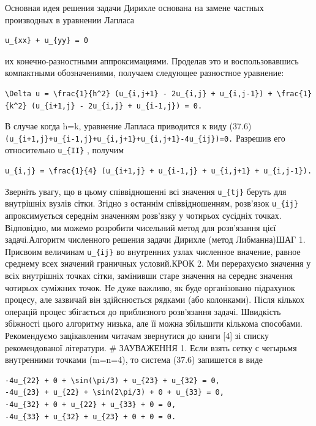 \documentclass[
  ukrainian,
]{article}
\begin{document}
Основная идея решения задачи Дирихле основана на замене частных
производных в уравнении Лапласа

\begin{verbatim}
u_{xx} + u_{yy} = 0
\end{verbatim}

их конечно-разностными аппроксимациями. Проделав это и воспользовавшись
компактными обозначениями, получаем следующее разностное уравнение:

\begin{verbatim}
\Delta u = \frac{1}{h^2} (u_{i,j+1} - 2u_{i,j} + u_{i,j-1}) + \frac{1}{k^2} (u_{i+1,j} - 2u_{i,j} + u_{i-1,j}) = 0.
\end{verbatim}

В случае когда h=k, уравнение Лапласа приводится к виду (37.6)
\texttt{(u\_\{i+1,j\}+u\_\{i-1,j\}+u\_\{i,j+1\}+u\_\{i,j+1\}-4u\_\{ij\})=0.}
Разрешив его относительно \texttt{u\_\{II\}} , получим

\begin{verbatim}
u_{i,j} = \frac{1}{4} (u_{i+1,j} + u_{i-1,j} + u_{i,j+1} + u_{i,j-1}).
\end{verbatim}

Зверніть увагу, що в цьому співвідношенні всі значення
\texttt{u\_\{tj\}} беруть для внутрішніх вузлів сітки. Згідно з останнім
співвідношенням, розв'язок \texttt{u\_\{ij\}} апроксимується середнім
значенням розв'язку у чотирьох сусідніх точках. Відповідно, ми можемо
розробити чисельний метод для розв'язання цієї задачі.Алгоритм
численного решения задачи Дирихле (метод Либманна)ШАГ 1. Присвоим
величинам \texttt{u\_\{ij\}} во внутренних узлах численное вначение,
равное среднему всех значений граничных условий.КРОК 2. Ми перерахуємо
значення у всіх внутрішніх точках сітки, замінивши старе значення на
середнє значення чотирьох суміжних точок. Не дуже важливо, як буде
організовано підрахунок процесу, але зазвичай він здійснюється рядками
(або колонками). Після кількох операцій процес збігається до приблизного
розв'язання задачі. Швидкість збіжності цього алгоритму низька, але її
можна збільшити кількома способами. Рекомендуємо зацікавленим читачам
звернутися до книги {[}4{]} зі списку рекомендованої літератури. \#
ЗАУВАЖЕННЯ 1. Если взять сетку с чегырьмя внутренними точками (m=n=4),
то система (37.6) запишется в виде

\begin{verbatim}
-4u_{22} + 0 + \sin(\pi/3) + u_{23} + u_{32} = 0,
-4u_{23} + u_{22} + \sin(2\pi/3) + 0 + u_{33} = 0,
-4u_{32} + 0 + u_{22} + u_{33} + 0 = 0,
-4u_{33} + u_{32} + u_{23} + 0 + 0 = 0.
\end{verbatim}
\end{document}
